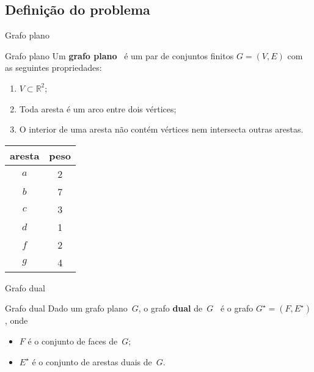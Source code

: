 \documentclass{IFES-beamer}
\newcommand{\R}{\mathbb{R}}
\newcommand{\defi}[1]{\textbf{#1}} %
\begin{document}
\subsection{Definição do problema}
\begin{frame}{Grafo plano}
\begin{block}{Grafo plano}
Um \defi{grafo plano}~\cite{Diestel} é um par de conjuntos finitos $G = (V, E)$ com as seguintes propriedades:
\begin{enumerate}
\item $V\subset \R^2$;
\item Toda aresta é um arco entre dois vértices;
\item O interior de uma aresta não contém vértices nem intersecta outras arestas.
\end{enumerate}
\end{block}
\begin{minipage}[H]{0.4\textwidth}
\begin{tabular}{| c  c |} 
 \hline
 aresta & peso\\
 \hline
 $a$ & 2 \\ 
 \hline
$b$ & 7 \\
 \hline
$c$ & 3 \\
 \hline
$d$ & 1 \\
 \hline
$f$ & 2 \\
 \hline
$g$ & 4 \\
 \hline
\end{tabular}
\end{minipage}
\begin{minipage}[H]{0.4\textwidth}
\begin{figure}[H]
\scalebox{1}{

	}
\end{figure}
\end{minipage}

\end{frame}




\begin{frame}{Grafo dual}
\begin{block}{Grafo dual}
Dado um grafo plano~$G$, o grafo \defi{dual} de~$G$~\cite{Diestel} é o grafo $G^\star = (F,E^\star)$, onde
\begin{itemize}
\item $F$ é o conjunto de faces de~$G$;
\item $E^\star$ é o conjunto de arestas duais de~$G$.
\end{itemize}
\end{block}
\begin{figure}[H]
\scalebox{1.2}{
\centering

}
\label{fig:MSF-basico-1}
\end{figure}
\end{frame}
\end{document}
